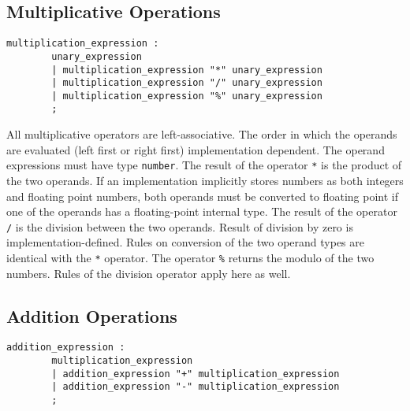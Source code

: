 \subsection{Multiplicative Operations}\label{multiplication}
\begin{verbatim}
multiplication_expression : 
        unary_expression
        | multiplication_expression "*" unary_expression
        | multiplication_expression "/" unary_expression
        | multiplication_expression "%" unary_expression
        ;
\end{verbatim}

All multiplicative operators are left-associative. The order in which the operands are evaluated (left first or right first) implementation dependent. The operand expressions must have type \texttt{number}. The result of the operator \texttt{*} is the product of the two operands. If an implementation implicitly stores numbers as both integers and floating point numbers, both operands must be converted to floating point if one of the operands has a floating-point internal type.
The result of the operator \texttt{/} is the division between the two operands. Result of division by zero is implementation-defined. Rules on conversion of the two operand types are identical with the \texttt{*} operator.
The operator \texttt{\%} returns the modulo of the two numbers. Rules of the division operator apply here as well.

\subsection{Addition Operations}\label{addition}
\begin{verbatim}
addition_expression : 
        multiplication_expression
        | addition_expression "+" multiplication_expression
        | addition_expression "-" multiplication_expression
        ;
\end{verbatim}

